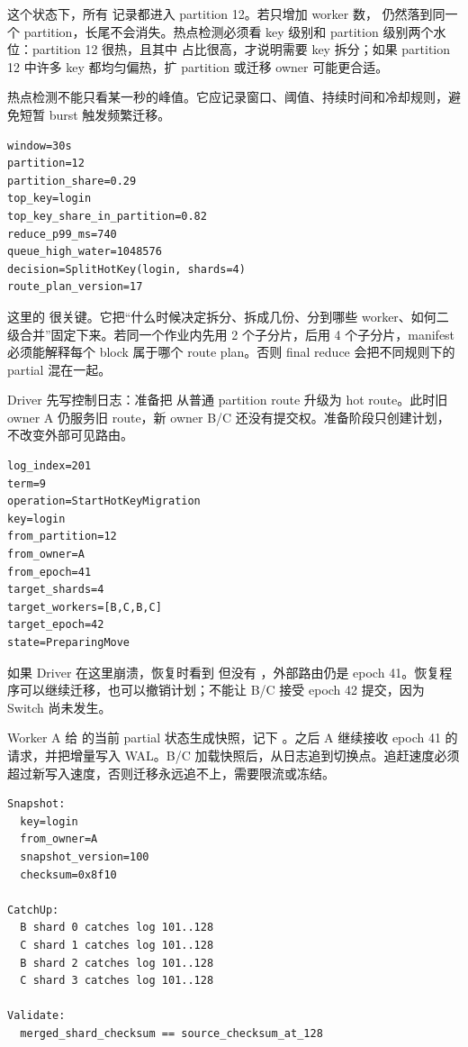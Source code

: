 这个状态下，所有  记录都进入 partition 12。若只增加 worker 数， 仍然落到同一个 partition，长尾不会消失。热点检测必须看 key 级别和 partition 级别两个水位：partition 12 很热，且其中  占比很高，才说明需要 key 拆分；如果 partition 12 中许多 key 都均匀偏热，扩 partition 或迁移 owner 可能更合适。

热点检测不能只看某一秒的峰值。它应记录窗口、阈值、持续时间和冷却规则，避免短暂 burst 触发频繁迁移。

\begin{lstlisting}[numbers=none,caption={热点检测摘要}]
window=30s
partition=12
partition_share=0.29
top_key=login
top_key_share_in_partition=0.82
reduce_p99_ms=740
queue_high_water=1048576
decision=SplitHotKey(login, shards=4)
route_plan_version=17
\end{lstlisting}

这里的  很关键。它把“什么时候决定拆分、拆成几份、分到哪些 worker、如何二级合并”固定下来。若同一个作业内先用 2 个子分片，后用 4 个子分片，manifest 必须能解释每个 block 属于哪个 route plan。否则 final reduce 会把不同规则下的 partial 混在一起。

Driver 先写控制日志：准备把  从普通 partition route 升级为 hot route。此时旧 owner A 仍服务旧 route，新 owner B/C 还没有提交权。准备阶段只创建计划，不改变外部可见路由。

\begin{lstlisting}[numbers=none,caption={Prepare 阶段控制日志}]
log_index=201
term=9
operation=StartHotKeyMigration
key=login
from_partition=12
from_owner=A
from_epoch=41
target_shards=4
target_workers=[B,C,B,C]
target_epoch=42
state=PreparingMove
\end{lstlisting}

如果 Driver 在这里崩溃，恢复时看到  但没有 ，外部路由仍是 epoch 41。恢复程序可以继续迁移，也可以撤销计划；不能让 B/C 接受 epoch 42 提交，因为 Switch 尚未发生。

Worker A 给  的当前 partial 状态生成快照，记下 。之后 A 继续接收 epoch 41 的请求，并把增量写入 WAL。B/C 加载快照后，从日志追到切换点。追赶速度必须超过新写入速度，否则迁移永远追不上，需要限流或冻结。

\begin{lstlisting}[numbers=none,caption={Snapshot 和 CatchUp 账本}]
Snapshot:
  key=login
  from_owner=A
  snapshot_version=100
  checksum=0x8f10

CatchUp:
  B shard 0 catches log 101..128
  C shard 1 catches log 101..128
  B shard 2 catches log 101..128
  C shard 3 catches log 101..128

Validate:
  merged_shard_checksum == source_checksum_at_128
\end{lstlisting}

